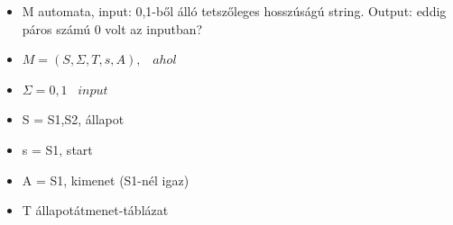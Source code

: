 \documentclass[11pt,a4paper]{article}
\begin{document}
            \begin{tcolorbox}[colback=blue!5!white,colframe=blue!50!black,title=2. Ismertesse a determinisztikus véges automata megadását és működését!]
        \begin{itemize}
            \item M automata, input: 0,1-ből álló tetszőleges hosszúságú string. Output: eddig páros számú 0 volt az inputban?
            \item \(M=(S, \Sigma ,T,s,A) ,\hspace{10pt} ahol\)
            \item \(\Sigma ={0,1} \hspace{10pt} input\)
            \item S = {S1,S2}, állapot
            \item s = S1, start
            \item A = {S1}, kimenet (S1-nél igaz)
            \item T állapotátmenet-táblázat
        \end{itemize}
        \begin{center}
        \end{center}
            \end{tcolorbox}
\end{document}
